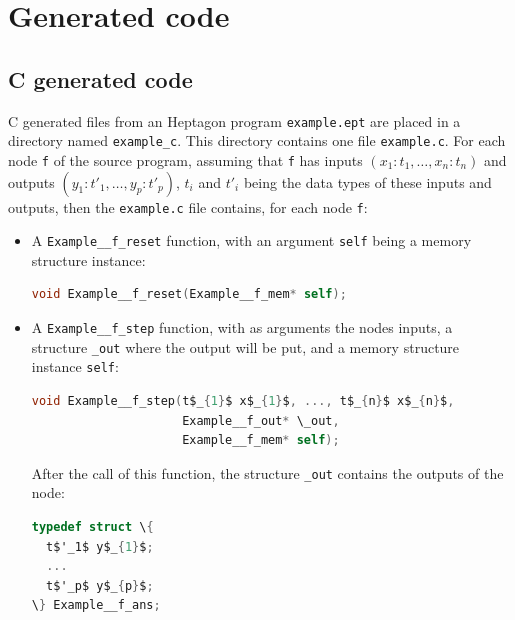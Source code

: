 \documentclass[a4paper]{article}
\begin{document}
\appendix

\section{Generated code}
\label{sec:app-generated-code}

\subsection{C generated code}
\label{sec:c-generated-code}

C generated files from an Heptagon program \texttt{example.ept} are placed in a
directory named \texttt{example\_c}. This directory contains one file
\texttt{example.c}. For each node \texttt{f} of the source program, assuming
that \texttt{f} has inputs $(x_1:t_1,\ldots,x_n:t_n)$ and outputs
$(y_1:t'_1,\ldots,y_p:t'_p)$, $t_i$ and $t'_i$ being the data types of these
inputs and outputs, then the \texttt{example.c} file contains, for each node
\texttt{f}:

\begin{itemize}
\item A \texttt{Example\_\_f\_reset} function, with an argument \texttt{self} being a
  memory structure instance:

\begin{lstlisting}[language=C]
void Example__f_reset(Example__f_mem* self);
\end{lstlisting}

\item A \texttt{Example\_\_f\_step} function, with as arguments the nodes inputs, a
  structure \texttt{\_out} where the output will be put, and a memory structure
  instance \texttt{self}:

\begin{lstlisting}[language=C]
void Example__f_step(t$_{1}$ x$_{1}$, ..., t$_{n}$ x$_{n}$,
                     Example__f_out* \_out,
                     Example__f_mem* self);
\end{lstlisting}

After the call of this function, the structure \texttt{\_out} contains the
outputs of the node:
\begin{lstlisting}[language=C]
typedef struct \{
  t$'_1$ y$_{1}$;
  ...
  t$'_p$ y$_{p}$;
\} Example__f_ans;
\end{lstlisting}
\end{itemize}
\end{document}

